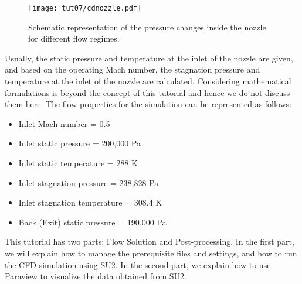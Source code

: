 \begin{figure}[H]
	\centering
	\texttt{[image: tut07/cdnozzle.pdf]}
	\caption{Schematic representation of the pressure changes inside the nozzle for different flow regimes.}
	\label{fig7:cdnozzle}
\end{figure}
Usually, the static pressure and temperature at the inlet of the nozzle are given, and based on the operating Mach number, the stagnation pressure and temperature at the inlet of the nozzle are calculated. Considering mathematical formulations is beyond the concept of this tutorial and hence we do not discuss them here. The flow properties for the simulation can be represented as follows:
\begin{itemize}
	\item Inlet Mach number = 0.5
	\item Inlet static pressure = 200,000 Pa
	\item Inlet static temperature = 288 K
	\item Inlet stagnation pressure = 238,828 Pa
	\item Inlet stagnation temperature = 308.4 K
	\item Back (Exit) static pressure = 190,000 Pa
\end{itemize}
This tutorial has two parts: Flow Solution and Post-processing. In the first part, we will explain how to manage the prerequisite files and settings, and how to run the CFD simulation using SU2. In the second part, we explain how to use Paraview to visualize the data obtained from SU2.

